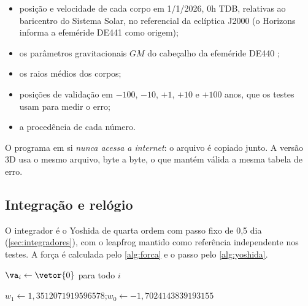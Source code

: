 \begin{itemize}
  \item posição e velocidade de cada corpo em 1/1/2026, 0h TDB, relativas ao baricentro do Sistema Solar, no referencial da eclíptica J2000 (o Horizons informa a efeméride DE441 como origem);
  \item os parâmetros gravitacionais $GM$ do cabeçalho da efeméride DE440 \cite{park2021};
  \item os raios médios dos corpos;
  \item posições de validação em $-100$, $-10$, $+1$, $+10$ e $+100$ anos, que os testes usam para medir o erro;
  \item a procedência de cada número.
\end{itemize}

O programa em si \emph{nunca acessa a internet}: o arquivo é copiado junto. A versão 3D usa o mesmo arquivo, byte a byte, o que mantém válida a mesma tabela de erro.

\subsection{Integração e relógio}

O integrador é o Yoshida de quarta ordem com passo fixo de 0,5 dia (\autoref{sec:integradores}), com o leapfrog mantido como referência independente nos testes. A força é calculada pelo \autoref{alg:forca} e o passo pelo \autoref{alg:yoshida}.

\begin{algorithm}[htb]
  \caption{Aceleração gravitacional mútua de $N$ corpos}\label{alg:forca}
  $\va_i \leftarrow \vetor{0}$ para todo $i$\;
\end{algorithm}

\begin{algorithm}[htb]
  \caption{Um passo de Yoshida de quarta ordem}\label{alg:yoshida}
  $w_1 \leftarrow 1{,}3512071919596578$;\quad $w_0 \leftarrow -1{,}7024143839193155$\;
\end{algorithm}

